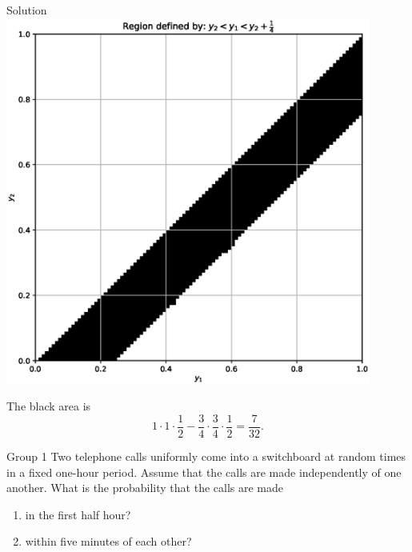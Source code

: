\documentclass{article}
\begin{document}
\begin{solution}
    {Solution}
    \includegraphics[width=0.9\textwidth, center]{plot3.eps}

    The black area is
    \[
    1\cdot1\cdot\frac{1}{2}-\frac{3}{4}\cdot\frac{3}{4}\cdot\frac{1}{2}=\frac{7}{32}.
    \]
\end{solution}
\begin{problem}
    {Group 1}
    Two telephone calls uniformly come into a switchboard at random times in a fixed one-hour period. Assume that the calls are made independently of one another. What is the probability that the calls are made
    \begin{enumerate}
        \item in the first half hour?
        \item within five minutes of each other?
    \end{enumerate}
\end{problem}
\end{document}
